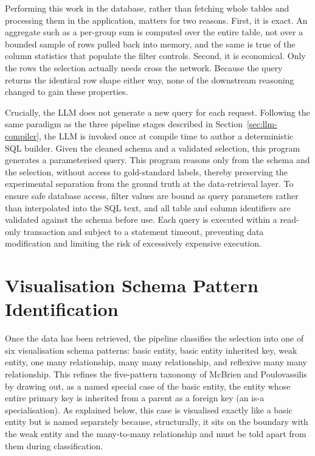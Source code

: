 Performing this work in the database, rather than fetching whole tables and processing them in the application, matters for two reasons. First, it is exact. An aggregate such as a per-group sum is computed over the entire table, not over a bounded sample of rows pulled back into memory, and the same is true of the column statistics that populate the filter controls. Second, it is economical. Only the rows the selection actually needs cross the network. Because the query returns the identical row shape either way, none of the downstream reasoning changed to gain these properties.

Crucially, the LLM does not generate a new query for each request. Following the same paradigm as the three pipeline stages described in Section~\ref{sec:llm-compiler}, the LLM is invoked once at compile time to author a deterministic SQL builder. Given the cleaned schema and a validated selection, this program generates a parameterised query. This program reasons only from the schema and the selection, without access to gold-standard labels, thereby preserving the experimental separation from the ground truth at the data-retrieval layer. To ensure safe database access, filter values are bound as query parameters rather than interpolated into the SQL text, and all table and column identifiers are validated against the schema before use. Each query is executed within a read-only transaction and subject to a statement timeout, preventing data modification and limiting the risk of excessively expensive execution.

\section{Visualisation Schema Pattern Identification}
\label{sec:step1}

Once the data has been retrieved, the pipeline classifies the selection into one of six visualisation schema patterns: basic entity, basic entity inherited key, weak entity, one many relationship, many many relationship, and reflexive many
many relationship. This refines the five-pattern taxonomy of McBrien and Poulovassilis \cite{brientowards} by drawing out, as a named special case of the basic entity, the entity whose entire primary key is inherited from a parent as a foreign key (an is-a specialisation). As explained below, this case is visualised exactly like a basic entity but is named separately because, structurally, it sits on the boundary with the weak entity and the many-to-many relationship and must be told apart from them during classification.


